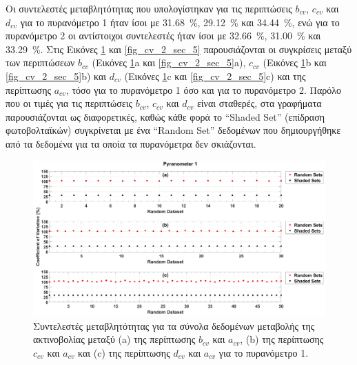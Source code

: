 \documentclass[12pt, a4paper]{report} %
\newcommand{\english}{\foreignlanguage{english}}
\begin{document}
Οι συντελεστές μεταβλητότητας που υπολογίστηκαν για τις περιπτώσεις \english{$b_{cv}$}, \english{$c_{cv}$} και 
\english{$d_{cv}$} για το πυρανόμετρο 1 ήταν ίσοι με \SI{31,68}{\percent}, \SI{29,12}{\percent} και \SI{34,44}{\percent}, 
ενώ για το πυρανόμετρο 2 οι αντίστοιχοι συντελεστές ήταν ίσοι με \SI{32,66}{\percent}, \SI{31,00}{\percent} και \SI{33,29}{\percent}. 
Στις Εικόνες \ref{fig_cv_1_sec_5} και \ref{fig_cv_2_sec_5} παρουσιάζονται οι συγκρίσεις μεταξύ των περιπτώσεων \english{$b_{cv}$} 
(Εικόνες \ref{fig_cv_1_sec_5}\english{a} και \ref{fig_cv_2_sec_5}\english{a}), \english{$c_{cv}$} (Εικόνες 
\ref{fig_cv_1_sec_5}\english{b} και \ref{fig_cv_2_sec_5}\english{b}) και \english{$d_{cv}$} (Εικόνες 
\ref{fig_cv_1_sec_5}\english{c} και \ref{fig_cv_2_sec_5}\english{c}) και της περίπτωσης \english{$a_{cv}$}, τόσο για το 
πυρανόμετρο 1 όσο και για το πυρανόμετρο 2. Παρόλο που οι τιμές για τις περιπτώσεις \english{$b_{cv}$}, \english{$c_{cv}$} 
και \english{$d_{cv}$} είναι σταθερές, στα γραφήματα παρουσιάζονται ως διαφορετικές, καθώς κάθε φορά το “\english{Shaded Set}” 
(επίδραση φωτοβολταϊκών) συγκρίνεται με ένα “\english{Random Set}” δεδομένων που δημιουργήθηκε από τα δεδομένα για τα οποία 
τα πυρανόμετρα δεν σκιάζονται.

\begin{figure}[H]
    \centering
    \includegraphics[width=0.9\linewidth]{CV_1_sec_5.jpg}
    \caption{Συντελεστές μεταβλητότητας για τα σύνολα δεδομένων μεταβολής της ακτινοβολίας μεταξύ 
    (\english{a}) της περίπτωσης \english{$b_{cv}$} και \english{$a_{cv}$}, (\english{b}) της περίπτωσης \english{$c_{cv}$} 
    και \english{$a_{cv}$} και (\english{c}) της περίπτωσης \english{$d_{cv}$} και \english{$a_{cv}$} για το πυρανόμετρο 1.}
    \label{fig_cv_1_sec_5}
\end{figure}
\end{document}
